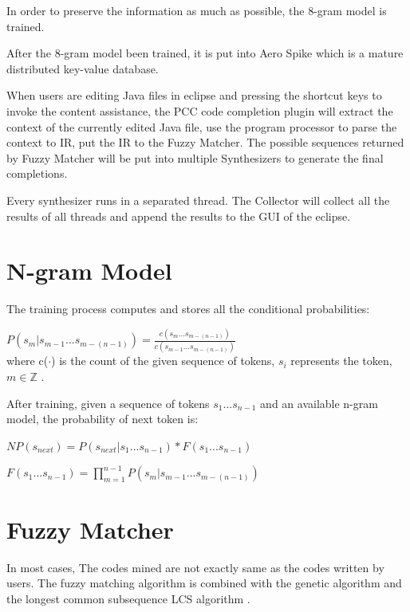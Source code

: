 \documentclass{sig-alternate-05-2015}
\begin{document}
In order to preserve the information as much as possible, the 8-gram model is trained.

After the 8-gram model been trained, it is put into Aero Spike\cite{aerospikedocs} which is a mature distributed key-value database.

When users are editing Java files in eclipse and pressing the shortcut keys to invoke the content assistance, the PCC code completion plugin will extract the context of the currently edited Java file, use the program processor to parse the context to IR, put the IR to the Fuzzy Matcher. The possible sequences returned by Fuzzy Matcher will be put into multiple Synthesizers to generate the final completions.

Every synthesizer runs in a separated thread. The Collector will collect all the results of all threads and append the results to the GUI of the eclipse.

\vspace{-0.1cm}
\section{N-gram Model}

The training process computes and stores all the conditional probabilities:

$P(s_m|s_{m-1}...s_{m-(n-1)}) = \frac{c(s_m...s_{m-(n-1)})}{c(s_{m-1}...s_{m-(n-1)})}$
\\where c($\cdot$) is the count of the given sequence of tokens, $s_i$ represents the token, $m \in \mathbb{Z}$ .

After training, given a sequence of tokens $s_1...s_{n-1}$ and an available n-gram model, the probability of next token is:

$NP(s_{next}) = P(s_{next}|s_1...s_{n-1}) * F(s_1...s_{n-1})$

$F(s_1...s_{n-1}) = \prod_{m=1}^{n-1}P(s_m|s_{m-1}...s_{m-(n-1)})$

\section{Fuzzy Matcher}

In most cases, The codes mined are not exactly same as the codes written by users. The fuzzy matching algorithm is combined with the genetic algorithm \cite{geneticalgorithm} and the longest common subsequence LCS algorithm \cite{introalgorithm}.
\end{document}
